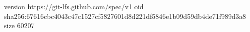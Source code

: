 version https://git-lfs.github.com/spec/v1
oid sha256:67616cbc4043c47c1527cf5827601d8d221df5846e1b09d59db4de71f989d3a8
size 60207
